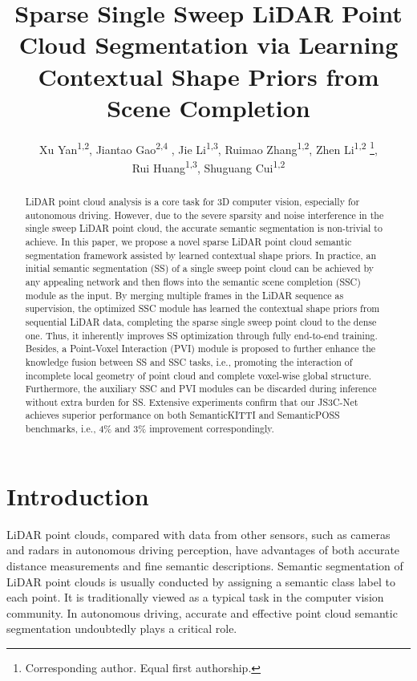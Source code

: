\documentclass[letterpaper]{article} \usepackage{aaai21}  \usepackage{times}  \usepackage{helvet} \usepackage{courier}  \usepackage[hyphens]{url}  \usepackage{graphicx} \urlstyle{rm} \def\UrlFont{\rm}  \usepackage{natbib}  \usepackage{booktabs}
\title{Sparse Single Sweep LiDAR Point Cloud Segmentation via Learning Contextual Shape Priors from Scene Completion}
\author {
Xu Yan\textsuperscript{\rm 1,2}, 
	Jiantao Gao\textsuperscript{\rm 2,4 }, 
    Jie Li\textsuperscript{\rm 1,3},
	Ruimao Zhang\textsuperscript{\rm 1,2},  
	Zhen Li\textsuperscript{\rm 1,2} \thanks{Corresponding author.  Equal first authorship.}, \\
	Rui Huang\textsuperscript{\rm 1,3}, 
	Shuguang Cui\textsuperscript{\rm 1,2}
	 \\
}
\begin{document}
	\maketitle
	\begin{abstract}
    LiDAR point cloud analysis is a core task for 3D computer vision, especially for autonomous driving. 
However, due to the severe sparsity and noise interference in the single sweep LiDAR point cloud, the accurate semantic segmentation is non-trivial to achieve. 
In this paper, we propose a novel sparse LiDAR point cloud semantic segmentation framework assisted by learned contextual shape priors.
In practice, an initial semantic segmentation (SS) of a single sweep point cloud can be achieved by any appealing network and then flows into the semantic scene completion (SSC) module as the input.
By merging multiple frames in the LiDAR sequence as supervision, the optimized SSC module has learned the contextual shape priors from sequential LiDAR data, completing the sparse single sweep point cloud to the dense one.
Thus, it inherently improves SS optimization through fully end-to-end training.
Besides, a Point-Voxel Interaction (PVI) module is proposed to further enhance the knowledge fusion between SS and SSC tasks, i.e., promoting the interaction of incomplete local geometry of point cloud and complete voxel-wise global structure.
Furthermore, the auxiliary SSC and PVI modules can be discarded during inference without extra burden for SS.
Extensive experiments confirm that our JS3C-Net achieves superior performance on both SemanticKITTI and SemanticPOSS benchmarks, i.e., 4\% and 3\% improvement correspondingly.

	\end{abstract}
	
	\section{Introduction}





    LiDAR point clouds, compared with data from other sensors, such as cameras and radars in autonomous driving perception, have advantages of both accurate distance measurements and fine semantic descriptions.
Semantic segmentation of LiDAR point clouds is usually conducted by assigning a semantic class label to each point. It is traditionally viewed as a typical task in the computer vision community. 
In autonomous driving, accurate and effective point cloud semantic segmentation undoubtedly plays a critical role.
\end{document}
